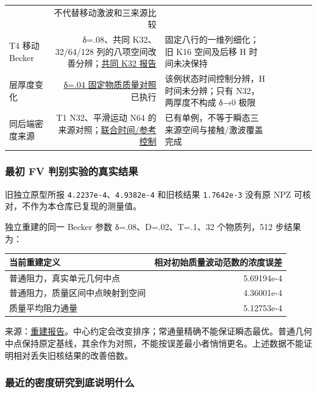 \documentclass[
  10pt,
  a4paper,
]{article}
\begin{document}
\begin{longtable}[]
{oracle 三档} & 不代替移动激波和三来源比较 \\
T4 移动 Becker & δ=.08、共同 K32、32/64/128
列的八项空间改善分辨；\href{https://github.com/hongjianli97/diffuse-mixing/blob/main/research/reconnect/BECKER_COMMON_K32_COMPARISON.md}{共同
K32 报告} & 固定八行的一维列细化；旧 K16 空间及后移 H 时间未决保持 \\
层厚度变化 &
\href{https://github.com/hongjianli97/diffuse-mixing/blob/main/research/reconnect/BECKER_DELTA004_COMPARISON.md}{δ=.04
固定物质质量对照} 已执行 & 该例状态时间控制分辨，H 时间未分辨；只有
N32，两厚度不构成 δ→0 极限 \\
同后端密度来源 & T1 N32、平滑运动 N64
的来源对照；\href{https://github.com/hongjianli97/diffuse-mixing/blob/main/research/reconnect/COMPRESSION_JOINT_CONTROL_RESULTS.md}{联合时间/参考控制}
& 已有单例，不等于瞬态三来源空间与接触/激波覆盖完成 \\
\end{longtable}

\subsubsection{最初 FV
判别实验的真实结果}\label{ux6700ux521d-fv-ux5224ux522bux5b9eux9a8cux7684ux771fux5b9eux7ed3ux679c}

旧独立原型所报 \nolinkurl{4.2237e-4}、\nolinkurl{4.9382e-4} 和旧核结果
\nolinkurl{1.7642e-3} 没有原 NPZ 可核对，不作为本仓库已复现的测量值。

独立重建的同一 Becker 参数 δ=.08、D=.02、T=.1、32 个物质列，512
步结果为：

\begin{longtable}[]{@{}lr@{}}
\toprule\noalign{}
当前重建定义 & 相对初始质量波动范数的浓度误差 \\
\midrule\noalign{}
\endhead
\bottomrule\noalign{}
\endlastfoot
普通阻力，真实单元几何中点 & 5.69194e-4 \\
普通阻力，质量区间中点映射到空间 & 4.36001e-4 \\
质量平均阻力通量 & 5.12753e-4 \\
\end{longtable}

来源：\href{https://github.com/hongjianli97/diffuse-mixing/blob/main/research/rebuild/REPORT.md}{重建报告}。中心约定会改变排序；常通量精确不能保证瞬态最优。普通几何中点保持原定基线，其余作为对照，不能按误差最小者悄悄更名。上述数据不能证明相对丢失旧核结果的改善倍数。

\subsubsection{最近的密度研究到底说明什么}\label{ux6700ux8fd1ux7684ux5bc6ux5ea6ux7814ux7a76ux5230ux5e95ux8bf4ux660eux4ec0ux4e48}
\end{document}
